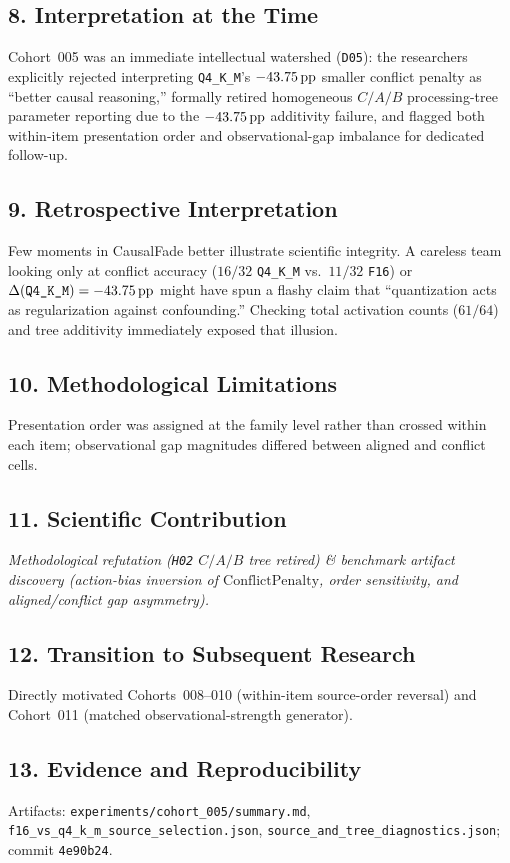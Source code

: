 \subsection*{8. Interpretation at the Time}
Cohort~005 was an immediate intellectual watershed (\texttt{D05}): the researchers explicitly rejected interpreting \texttt{Q4\_K\_M}'s $-43.75\,\mathrm{pp}$ smaller conflict penalty as ``better causal reasoning,'' formally retired homogeneous $C/A/B$ processing-tree parameter reporting due to the $-43.75\,\mathrm{pp}$ additivity failure, and flagged both within-item presentation order and observational-gap imbalance for dedicated follow-up.

\subsection*{9. Retrospective Interpretation}
Few moments in CausalFade better illustrate scientific integrity. A careless team looking only at conflict accuracy ($16/32$ \texttt{Q4\_K\_M} vs.\ $11/32$ \texttt{F16}) or $\Delta(\text{\texttt{Q4\_K\_M}}) = -43.75\,\mathrm{pp}$ might have spun a flashy claim that ``quantization acts as regularization against confounding.'' Checking total activation counts ($61/64$) and tree additivity immediately exposed that illusion.

\subsection*{10. Methodological Limitations}
Presentation order was assigned at the family level rather than crossed within each item; observational gap magnitudes differed between aligned and conflict cells.

\subsection*{11. Scientific Contribution}
\emph{Methodological refutation (\texttt{H02} $C/A/B$ tree retired) \& benchmark artifact discovery (action-bias inversion of $\mathrm{ConflictPenalty}$, order sensitivity, and aligned/conflict gap asymmetry).}

\subsection*{12. Transition to Subsequent Research}
Directly motivated Cohorts~008--010 (within-item source-order reversal) and Cohort~011 (matched observational-strength generator).

\subsection*{13. Evidence and Reproducibility}
Artifacts: \texttt{experiments/cohort\_005/summary.md}, \texttt{f16\_vs\_q4\_k\_m\_source\_selection.json}, \texttt{source\_and\_tree\_diagnostics.json}; commit \texttt{4e90b24}.

